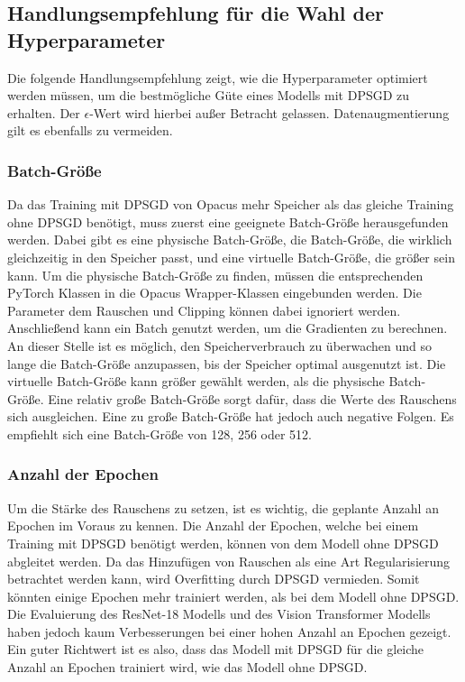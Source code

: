 \subsection{Handlungsempfehlung für die Wahl der Hyperparameter}

Die folgende Handlungsempfehlung zeigt, wie die Hyperparameter optimiert werden müssen, um die bestmögliche Güte eines Modells mit DPSGD zu erhalten. 
Der $\epsilon$-Wert wird hierbei außer Betracht gelassen.
Datenaugmentierung gilt es ebenfalls zu vermeiden.

\subsubsection*{Batch-Größe}
Da das Training mit DPSGD von Opacus mehr Speicher als das gleiche Training ohne DPSGD benötigt, muss zuerst eine geeignete Batch-Größe herausgefunden werden.
Dabei gibt es eine physische Batch-Größe, die Batch-Größe, die wirklich gleichzeitig in den Speicher passt, und eine virtuelle Batch-Größe, die größer sein kann.
Um die physische Batch-Größe zu finden, müssen die entsprechenden PyTorch Klassen in die Opacus Wrapper-Klassen eingebunden werden.
Die Parameter \bzgl dem Rauschen und Clipping können dabei ignoriert werden.
Anschließend kann ein Batch genutzt werden, um die Gradienten zu berechnen. 
An dieser Stelle ist es möglich, den Speicherverbrauch zu überwachen und so lange die Batch-Größe anzupassen, bis der Speicher optimal ausgenutzt ist.
Die virtuelle Batch-Größe kann größer gewählt werden, als die physische Batch-Größe.
Eine relativ große Batch-Größe sorgt dafür, dass die Werte des Rauschens sich ausgleichen. 
Eine zu große Batch-Größe hat jedoch auch negative Folgen.
Es empfiehlt sich eine Batch-Größe von 128, 256 oder 512.

\subsubsection*{Anzahl der Epochen}
Um die Stärke des Rauschens zu setzen, ist es wichtig, die geplante Anzahl an Epochen im Voraus zu kennen.
Die Anzahl der Epochen, welche bei einem Training mit DPSGD benötigt werden, können von dem Modell ohne DPSGD abgleitet werden.
Da das Hinzufügen von Rauschen als eine Art Regularisierung betrachtet werden kann, wird Overfitting durch DPSGD vermieden.
Somit könnten einige Epochen mehr trainiert werden, als bei dem Modell ohne DPSGD.
Die Evaluierung des ResNet-18 Modells und des Vision Transformer Modells haben jedoch kaum Verbesserungen bei einer hohen Anzahl an Epochen gezeigt.
Ein guter Richtwert ist es also, dass das Modell mit DPSGD für die gleiche Anzahl an Epochen trainiert wird, wie das Modell ohne DPSGD.

